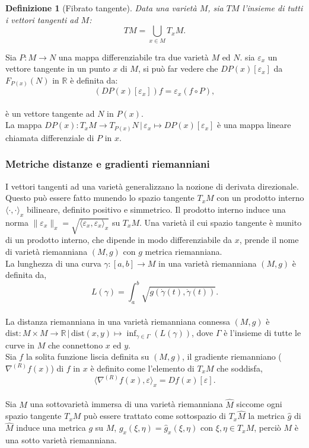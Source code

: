 \documentclass[a4paper, 12pt]{article}
\newtheorem{definition}{Definizione}
\begin{document}
\begin{definition}[Fibrato tangente]
Data una varietà $M$, sia $TM$ l'insieme di tutti i vettori tangenti ad $M$:\\
\[TM = \bigcup_{x \in M} T_xM.\]
\end{definition}
Sia $P:M \to N$ una mappa differenziabile tra due varietà $M$ ed $N$. sia $\varepsilon_x$ un vettore tangente in un punto $x$ di $M$, si può far vedere che $DP(x)[\varepsilon_x]$ da $F_{P(x)}(N)$ in $\mathbb{R}$ è definita da:\\
\[(DP(x)[\varepsilon_x])f = \varepsilon_x(f \circ P),\]\\
è un vettore tangente ad $N$ in $P(x)$.\\
La mappa $DP(x) : T_xM \to T_{P(x)}N \, | \, \varepsilon_x \mapsto DP(x)[\varepsilon_x]$ è una mappa lineare chiamata differenziale di $P$ in $x$.
\subsubsection{Metriche distanze e gradienti riemanniani}
I vettori tangenti ad una varietà generalizzano la nozione di derivata direzionale. Questo può essere fatto munendo lo spazio tangente $T_xM$ con un prodotto interno $\langle \cdot, \cdot \rangle_x$ bilineare, definito positivo e simmetrico. Il prodotto interno induce una norma $\| \varepsilon_x \|_x = \sqrt{\langle \varepsilon_x, \varepsilon_x \rangle_x}$ su $T_xM$. Una varietà il cui spazio tangente è munito di un prodotto interno, che dipende in modo differenziabile da $x$, prende il nome di varietà riemanniana $(M, g)$ con $g$ metrica riemanniana.\\
La lunghezza di una curva $\gamma:[a,b] \to M$ in una varietà riemanniana $(M, g)$ è definita da,\\
\[L(\gamma) = \int_a^b \sqrt{g(\dot{\gamma} (t), \dot{\gamma} (t))}.\]\\
La distanza riemanniana in una varietà riemanniana connessa $(M,g)$ è $\mathrm{dist}: M \times M \to \mathbb{R} \, | \, \mathrm{dist}(x,y) \mapsto \inf_{\gamma \in \Gamma}(L(\gamma))$, dove $\Gamma$ è l'insieme di tutte le curve in $M$ che connettono $x$ ed $y$.\\
Sia $f$ la solita funzione liscia definita su $(M,g)$, il gradiente riemanniano ($\nabla^{(R)} f(x)$) di $f$ in $x$ è definito come l'elemento di $T_xM$ che soddisfa,\\
\[\langle \nabla^{(R)} f(x), \varepsilon \rangle_x = Df(x)[\varepsilon].\]\\
Sia $M$ una sottovarietà immersa di una varietà riemanniana $\widehat{M}$ siccome ogni spazio tangente $T_xM$ può essere trattato come sottospazio di $T_x\widehat{M}$ la metrica $\widehat{g}$ di $\widehat{M}$ induce una metrica $g$ su $M$, $g_x(\xi, \eta) = \widehat{g}_x(\xi, \eta)$ con $\xi, \eta \in T_xM$, perciò $M$ è una sotto varietà riemanniana.
\end{document}
